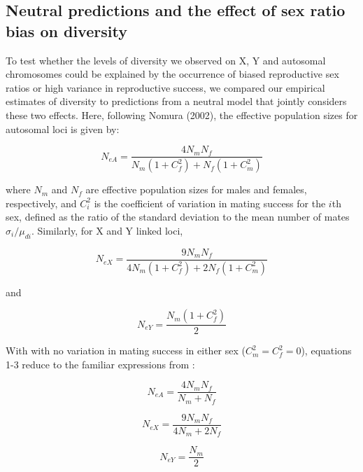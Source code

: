 \documentclass[9pt,twocolumn,twoside]{gsajnl}
\begin{document}
\subsection*{Neutral predictions and the effect of sex ratio bias on diversity}
To test whether the levels of diversity we observed on X, Y and autosomal chromosomes could be explained by the occurrence of biased reproductive sex ratios or high variance in reproductive success, we compared our empirical estimates of diversity to predictions from a neutral model that jointly considers these two effects. Here, following Nomura (2002), the effective population sizes for autosomal loci is given by:

\begin{equation}
N_{e{A}} = \frac{4N_{m}N_{f}}{N_{m}(1+C^2_{f})+N_{f}(1+C^2_{m})}\label{eq:NeA}
\end{equation}

where $N_{m}$ and $N_{f}$ are effective population sizes for males and females, respectively, and $C^2_{i}$ is the coefficient of variation in mating success for the $i$th sex, defined as the ratio of the standard deviation to the mean number of mates $\sigma_{i}/\mu_{d{i}}$. Similarly, for X and Y linked loci, 

\begin{equation}
N_{e{X}} = \frac{9N_{m}N_{f}}{4N_{m}(1+C^2_{f})+2N_{f}(1+C^2_{m})}\label{eq:NeX}
\end{equation}

and

\begin{equation}
N_{e{Y}} = \frac{N_{m}(1+C^2_{f})}{2}\label{eq:NeY}
\end{equation}

With with no variation in mating success in either sex ($C^2_{m}=C^2_{f}=0$), equations 1-3 reduce to the familiar expressions from \citep{wright1931evolution}:

\begin{equation}
N_{e{A}} = \frac{4N_{m}N_{f}}{N_{m}+N_{f}}\label{eq:NeA}
\end{equation}


\begin{equation}
N_{e{X}} = \frac{9N_{m}N_{f}}{4N_{m}+2N_{f}}\label{eq:NeX}
\end{equation}

\begin{equation}
N_{e{Y}} = \frac{N_{m}}{2}\label{eq:NeY}
\end{equation}
\end{document}
